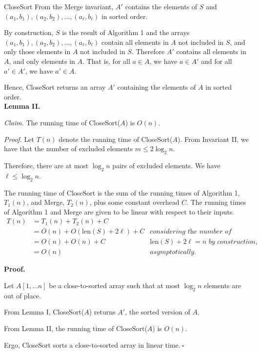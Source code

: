 \begin{enumerate}
\begin{solution}{\sc CloseSort}
From the {\sc Merge} invariant, $A'$ contains the elements of $S$ and $(a_1,b_1),(a_2,b_2),\dots,(a_\ell,b_\ell)$ in sorted order.

By construction, $S$ is the result of Algorithm 1 and the arrays $(a_1,b_1),(a_2,b_2),\dots,(a_\ell,b_\ell)$ contain all 
elements in $A$ not included in $S$, and only those elements in $A$ not included in $S$. Therefore $A'$ contains all elements in $A$, and only elements in $A$. That is, for all $a\in A$, we have $a\in A'$ and for all $a'\in A'$, we have $a'\in A$.

Hence, {\sc CloseSort} returns an array $A'$ containing the elements of $A$ in sorted order.\\

\textbf{Lemma II.}

\textit{Claim. }The running time of {\sc CloseSort}($A$) is $O(n)$.

\textit{Proof. }Let $T(n)$ denote the running time of {\sc CloseSort}($A$). From Invariant II, we have that the number of excluded elements $m\leq 2\log_2n$.

Therefore, there are at most $\log_2n$ pairs of excluded elements. We have $\ell\leq\log_2n$.

The running time of {\sc CloseSort} is the sum of the running times of Algorithm 1, $T_1(n)$, and {\sc Merge}, $T_2(n)$, plus some constant overhead $C$. The running times of Algorithm 1 and {\sc Merge} are given to be linear with respect to their inputs.
\begin{align*}
T(n)&=T_1(n)+T_2(n)+C&~\\
&=O(n)+O(\text{len}(S)+2\ell)+C&\textit{considering the number of elements to merge,}\\
&=O(n)+O(n)+C&\textit{$\text{len}(S)+2\ell=n$ by construction,}\\
&=O(n)&\textit{asymptotically.}
\end{align*}

\textbf{Proof.}

Let $A[1,\dots n]$ be a close-to-sorted array such that at most $\log_2n$ elements are out of place.

From Lemma I, {\sc CloseSort}($A$) returns $A'$, the sorted version of $A$. 

From Lemma II, the running time of {\sc CloseSort}($A$) is $O(n)$.

Ergo, {\sc CloseSort} sorts a close-to-sorted array in linear time.$~\square$
\end{solution}
\end{enumerate}
